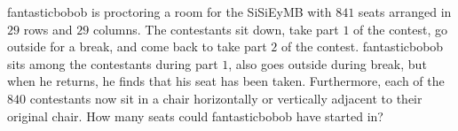 fantasticbobob is proctoring a room for the SiSiEyMB with $841$ seats arranged in $29$ rows and $29$ columns. The contestants sit down, take part $1$ of the contest, go outside for a break, and come back to take part $2$ of the contest. fantasticbobob sits among the contestants during part $1$, also goes outside during break, but when he returns, he finds that his seat has been taken. Furthermore, each of the $840$ contestants now sit in a chair horizontally or vertically adjacent to their original chair. How many seats could fantasticbobob have started in?